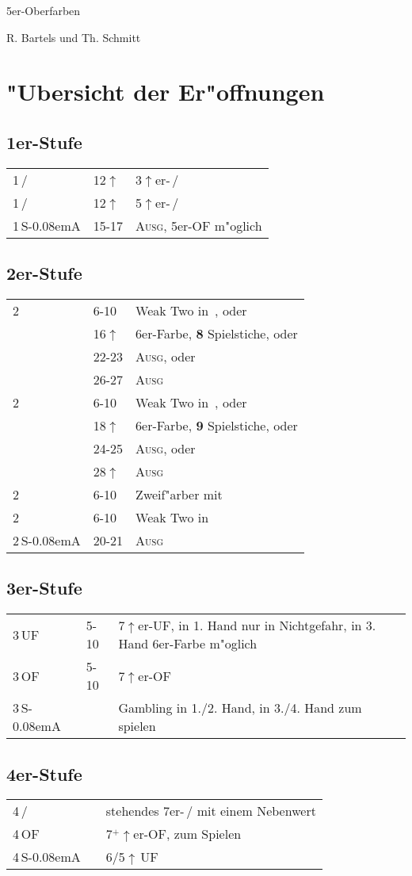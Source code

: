 \documentclass[11pt,german,twocolumn]{scrartcl}
\def\pik{\nobreak\,\Sp\xspace}
\def\coe{\nobreak\,\He\xspace}
\def\kar{\nobreak\,\Di\xspace}
\def\tre{\nobreak\,\Cl\xspace}
\def\mi{\,\Cl /\Di\xspace}
\def\ma{\,\He /\Sp\xspace}
\def\good{$^+$\xspace}
\def\pl{$\uparrow$\xspace}
\def\uf{\nobreak\textsf{\,UF}\xspace}
\def\of{\nobreak\textsf{\,OF}\xspace}
\def\ufa{\nobreak\textsf{UF}\xspace}
\def\ofa{\nobreak\textsf{OF}\xspace}
\def\sa{\nobreak\textsf{S\kern-0.08emA}\xspace}
\def\SA{\nobreak\,\sa}
\def\bal{\textsc{Ausg}\xspace}
\newcommand\bidins[1]%
{%
\begin{flushleft}
\begin{tabularx}{\columnwidth}{llX}%
#1
\end{tabularx}%
\end{flushleft}
}
\begin{document}
\setlength{\itemsep}{0ex plus0.2ex}

\begin{center}
{\Huge 5er-Oberfarben

\huge R. Bartels und Th. Schmitt}
\end{center}
\tableofcontents

\newpage
\section{"Ubersicht der Er"offnungen}

\subsection*{1er-Stufe}
\bidins{%
1\mi & 12\pl	& 3\pl{}er-\mi\\[1ex]
1\ma & 12\pl	& 5\pl{}er-\ma\\[1ex]
1\SA & 15-17	& \bal, 5er-\ofa m"oglich
}

\subsection*{2er-Stufe}
\bidins{%
2\tre	& 6-10	& Weak Two in \kar, oder\\
	& 16\pl	& 6er-Farbe, \textbf{8} Spielstiche, oder\\
	& 22-23	& \bal, oder\\
	& 26-27	& \bal\\[1ex]
2\kar	& 6-10	& Weak Two in \coe, oder\\
	& 18\pl	& 6er-Farbe, \textbf{9} Spielstiche, oder\\
	& 24-25	& \bal, oder\\
	& 28\pl	& \bal\\[1ex]
2\coe	& 6-10	& Zweif"arber mit \coe\\[1ex]
2\pik	& 6-10	& Weak Two in \pik\\[1ex]
2\SA	& 20-21	& \bal
}

\subsection*{3er-Stufe}
\bidins{%
3\uf	& 5-10	& 7\pl{}er-\ufa, in 1. Hand nur in Nichtgefahr, in 3. Hand 6er-Farbe m"oglich\\[1ex]
3\of	& 5-10	& 7\pl{}er-\ofa\\[1ex]
3\SA	& 	& Gambling in 1./2. Hand, in 3./4. Hand zum spielen
}

\subsection*{4er-Stufe}
\bidins{%
4\mi	& 	& stehendes 7er-\ma mit einem Nebenwert\\[1ex]
4\of	&	& 7\good{}\pl{}er-\ofa, zum Spielen\\[1ex]
4\SA	&	& 6/5\pl\uf
}
\end{document}
